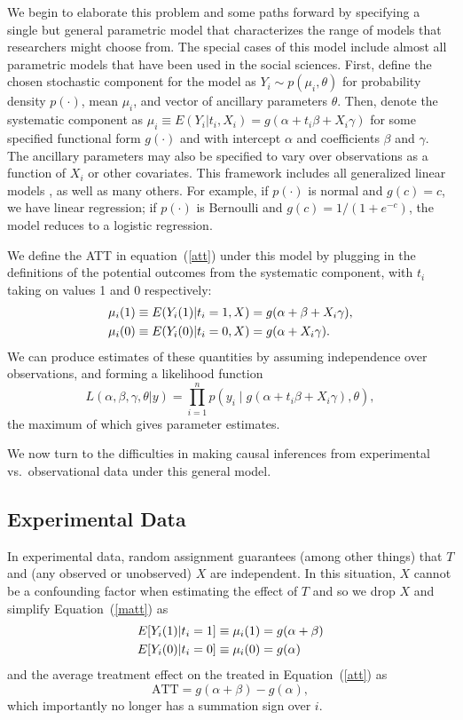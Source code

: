 \documentclass[11pt,titlepage]{article}
\begin{document}
We begin to elaborate this problem and some paths forward by
specifying a single but general parametric model that characterizes
the range of models that researchers might choose from.  The special
cases of this model include almost all parametric models that have
been used in the social sciences.  First, define the chosen stochastic
component for the model as $Y_i \sim p(\mu_i,\theta)$ for probability
density $p(\cdot)$, mean $\mu_i$, and vector of ancillary parameters
$\theta$.  Then, denote the systematic component as $\mu_i\equiv
E(Y_i|t_i,X_i)=g(\alpha + t_i\beta + X_i\gamma)$ for some specified
functional form $g(\cdot)$ and with intercept $\alpha$ and
coefficients $\beta$ and $\gamma$.  The ancillary parameters may also
be specified to vary over observations as a function of $X_i$ or other
covariates.  This framework includes all generalized linear models
\citep{McCNel89}, as well as many others.  For example, if $p(\cdot)$
is normal and $g(c)=c$, we have linear regression; if $p(\cdot)$ is
Bernoulli and $g(c)=1/(1+e^{-c})$, the model reduces to a logistic
regression.

We define the ATT in equation~(\ref{att}) under this model by plugging
in the definitions of the potential outcomes from the systematic
component, with $t_i$ taking on values 1 and 0 respectively:
\begin{align}
  \label{matt}
\mu_i(1)&\equiv E(Y_i(1)|t_i=1,X)= g(\alpha + \beta + X_i\gamma),\notag \\
\mu_i(0)&\equiv E(Y_i(0)|t_i=0,X) = g(\alpha + X_i\gamma).
\end{align}
We can produce estimates of these quantities by assuming independence
over observations, and forming a likelihood function
\begin{equation}
  \label{lik}
  L(\alpha,\beta,\gamma,\theta|y) = \prod_{i=1}^n 
  p\left(y_i \mid g(\alpha + t_i\beta + X_i\gamma), \theta\right),
\end{equation}
the maximum of which gives parameter estimates.

We now turn to the difficulties in making causal inferences from
experimental vs.\ observational data under this general model.

\subsection{Experimental Data}\label{s:paraexp}

In experimental data, random assignment guarantees (among other
things) that $T$ and (any observed or unobserved) $X$ are independent.
In this situation, $X$ cannot be a confounding factor when estimating
the effect of $T$ and so we drop $X$ and simplify
Equation~(\ref{matt}) as
\begin{align}
  \label{smatt}
  E[Y_i(1)|t_i=1] &\equiv \mu_i(1) = g(\alpha + \beta)\notag \\
  E[Y_i(0)|t_i=0] &\equiv \mu_i(0) = g(\alpha)
\end{align}
and the average treatment effect on the treated in
Equation~(\ref{att}) as
\begin{equation}
  \label{satt}
  \text{ATT} = g(\alpha+\beta) - g(\alpha),
\end{equation}
which importantly no longer has a summation sign over $i$.
\end{document}
